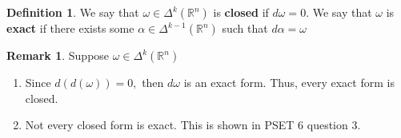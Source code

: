 \documentclass[10pt, oneside]{article}
\newcommand{\bbR}{\mathbb{R}}
\theoremstyle{definition}
\newtheorem{defn}{Definition}
\newtheorem{rem}{Remark}
\begin{document}
\begin{defn}
    We say that $\omega \in \Delta^k(\bbR^n)$ is \textbf{closed} if $d\omega = 0.$ We say that $\omega$ is \textbf{exact} if there exists some $\alpha\in \Delta^{k-1}(\bbR^n)$ such that $d\alpha = \omega$
\end{defn}
\begin{rem}
Suppose $\omega \in \Delta^k(\bbR^n)$
    \begin{enumerate}
        \item Since $d(d(\omega)) = 0,$ then $d\omega$ is an exact form. Thus, every exact form is closed. 
        \item Not every closed form is exact. This is shown in PSET 6 question 3.
    \end{enumerate}
\end{rem}

\newpage
\end{document}
